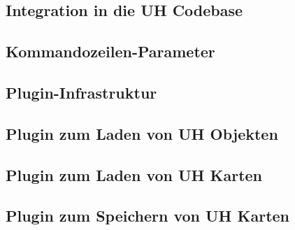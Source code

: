 \subsection{Integration in die UH Codebase}
\subsection{Kommandozeilen-Parameter}
\subsection{Plugin-Infrastruktur}
\subsection{Plugin zum Laden von UH Objekten}
\subsection{Plugin zum Laden von UH Karten}
\subsection{Plugin zum Speichern von UH Karten}

